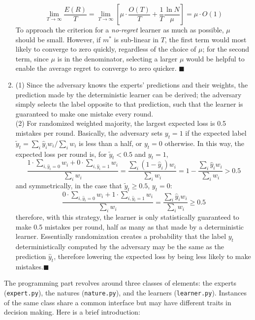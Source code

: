 \documentclass{article}
\newcommand{\qed}{\hfill$\blacksquare$}
\begin{document}
\begin{enumerate}
		\begin{equation}
			\lim_{T\rightarrow\infty}\frac{E(R)}{T}=
			\lim_{T\rightarrow\infty}\left[\mu\cdot\frac{O(T)}{T}+\frac1T\frac{\ln N}{\mu}\right]=
			\mu\cdot O(1)
		\end{equation}
		To approach the criterion for a {\it no-regret} learner as much as possible, $\mu$ should be small.
		However, if $m^*$ is sub-linear in $T$, the first term would most likely to converge to zero quickly,
		regardless of the choice of $\mu$; for the second term, since $\mu$ is in the denominator, 
		selecting a larger $\mu$ would be helpful to enable the average regret to converge to zero quicker. 
		\qed
	\item (1) Since the adversary knows the experts' predictions and their weights, the prediction made 
		by the deterministic learner can be derived; the adversary simply selects the label opposite to that 
		prediction, such that the learner is guaranteed to make one mistake every round. \\[\parsep]		
		(2) For randomized weighted majority, the largest expected loss is 0.5 mistakes per round. Basically,
		the adversary sets $y_t=1$ if the expected label $\tilde y_t=\sum_i\hat{y}_i{w_i}/\sum_i{w_i}$
		 is less than a half, or $y_t=0$ otherwise. In this way, the expected loss 
		 per round is, for $\tilde y_t<0.5$ and $y_t=1$, 
		\begin{equation}
			\frac{1\cdot\sum_{i,\hat{y}_i=0}w_i+0\cdot\sum_{i,\hat{y}_i=1}w_i}{\sum_iw_i}=
			\frac{\sum_i(1-\hat{y}_i)w_i}{\sum_iw_i}=1-\frac{\sum_i\hat{y}_iw_i}{\sum_iw_i}>0.5
		\end{equation}
		and symmetrically, in the case that $\tilde y_t\ge 0.5$, $y_t=0$:
		\begin{equation}
			\frac{0\cdot\sum_{i,\hat{y}_i=0}w_i+1\cdot\sum_{i,\hat{y}_i=1}w_i}{\sum_iw_i}=
			\frac{\sum_i\hat{y}_iw_i}{\sum_iw_i}\ge0.5
		\end{equation}
		therefore, with this strategy, the learner is only statistically guaranteed to make 0.5 mistakes
		per round, half as many as that made by a deterministic learner. Essentially randomization creates
		a probability that the label $y_t$ deterministically computed by the adversary may be the same as 
		the prediction $\hat y_t$, therefore lowering the expected loss by being less likely to make mistakes.\qed
\end{enumerate}

\newpage

The programming part revolves around three classes of elements: the experts ({\tt expert.py}), the natures ({\tt nature.py}), 
and the learners ({\tt learner.py}). Instances of the same class share a common interface but may have
different traits in decision making. Here is a brief introduction: 
\end{document}
